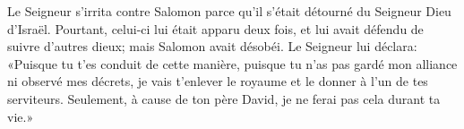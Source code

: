 Le Seigneur s’irrita contre Salomon
	parce qu’il s’était détourné du Seigneur Dieu d’Israël.
Pourtant, celui-ci lui était apparu deux fois,
	et lui avait défendu de suivre d’autres dieux; mais Salomon avait désobéi.
Le Seigneur lui déclara:
	«Puisque tu t’es conduit de cette manière,
	puisque tu n’as pas gardé mon alliance ni observé mes décrets,
	je vais t’enlever le royaume et le donner à l’un de tes serviteurs.
Seulement, à cause de ton père David, je ne ferai pas cela durant ta vie.»
